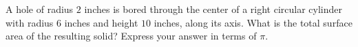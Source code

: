 A hole of radius $2$ inches is bored through the center of a right circular cylinder with radius $6$ inches and height $10$ inches, along its axis. What is the total surface area of the resulting solid? Express your answer in terms of $\pi$.
